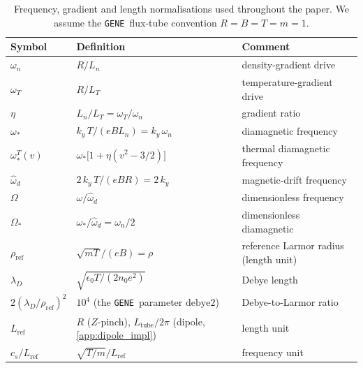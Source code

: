 \documentclass{jpp}
\newcommand{\lambdaD}{\lambda_D}
\newcommand{\gene}{\texttt{GENE}}
\begin{document}
\begin{table}
\centering
\renewcommand{\arraystretch}{1.2}
\small
\setlength{\tabcolsep}{2pt}
\begin{tabular}{@{}lll@{}}
\hline
Symbol & Definition & Comment \\
\hline
$\omega_n$           & $R/L_n$                                & density-gradient drive \\
$\omega_T$           & $R/L_T$                                & temperature-gradient drive \\
$\eta$               & $L_n/L_T = \omega_T/\omega_n$          & gradient ratio \\
$\omega_*$           & $k_y\,T/(e B L_n) = k_y\,\omega_n$     & diamagnetic frequency \\
$\omega_*^T(v)$      & $\omega_*\bigl[1 + \eta(v^2 - 3/2)\bigr]$ & thermal diamagnetic frequency \\
$\hat\omega_d$       & $2\,k_y\,T/(e B R) = 2\,k_y$           & magnetic-drift frequency \\
$\Omega$             & $\omega/\hat\omega_d$                  & dimensionless frequency \\
$\Omega_*$           & $\omega_*/\hat\omega_d = \omega_n/2$   & dimensionless diamagnetic \\
$\rho_\mathrm{ref}$  & $\sqrt{m T}/(e B) = \rho$              & reference Larmor radius (length unit) \\
$\lambdaD$           & $\sqrt{\epsilon_0 T/(2 n_0 e^2)}$       & Debye length \\
$2(\lambdaD/\rho_\mathrm{ref})^2$ & $10^4$ (the \gene\ parameter $\mathrm{debye2}$) & Debye-to-Larmor ratio \\
$L_\mathrm{ref}$     & $R$ ($Z$-pinch), $L_\mathrm{tube}/2\pi$ (dipole, \cref{app:dipole_impl}) & length unit \\
$c_s/L_\mathrm{ref}$ & $\sqrt{T/m}/L_\mathrm{ref}$            & frequency unit \\
\hline
\end{tabular}
\caption{Frequency, gradient and length normalisations used throughout the paper. We assume the \gene\ flux-tube convention $R = B = T = m = 1$.}
\label{tab:norms}
\end{table}
\end{document}
